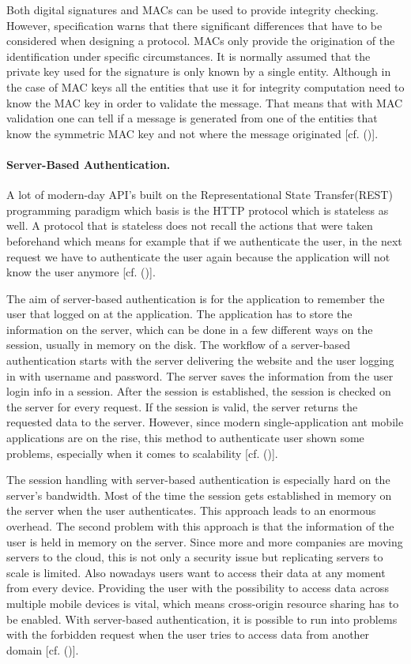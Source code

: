 {{	Both digital signatures and MACs can be used to provide integrity checking. However, specification warns that there significant differences that have to be considered when designing a protocol. MACs only provide the origination of the identification under specific circumstances. It is normally assumed that the private key used for the signature is only known by a single entity. Although in the case of MAC keys all the entities that use it for integrity computation need to know the MAC key in order to validate the message. That means that with MAC validation one can tell if a message is generated from one of the entities that know the symmetric MAC key and not where the message originated [cf. (\cite{JWT:IETF:Jones:2015})].


\paragraph{Server-Based Authentication.}
A lot of modern-day API’s built on the Representational State Transfer(REST) programming paradigm which basis is the HTTP protocol which is stateless as well. A protocol that is stateless does not recall the actions that were taken beforehand which means for example that if we authenticate the user, in the next request we have to authenticate the user again because the application will not know the user anymore [cf. (\cite{Serilleja:2015:Scothio})]. 

The aim of server-based authentication is for the application to remember the user that logged on at the application. The application has to store the information on the server, which can be done in a few different ways on the session, usually in memory on the disk. The workflow of a server-based authentication starts with the server delivering the website and the user logging in with username and password. The server saves the information from the user login info in a session. After the session is established, the session is checked on the server for every request. If the session is valid, the server returns the requested data to the server. However, since modern single-application ant mobile applications are on the rise, this method to authenticate user shown some problems, especially when it comes to scalability [cf. (\cite{Serilleja:2015:Scothio})]. 

The session handling with server-based authentication is especially hard on the server’s bandwidth. Most of the time the session gets established in memory on the server when the user authenticates. This approach leads to an enormous overhead. The second problem with this approach is that the information of the user is held in memory on the server. Since more and more companies are moving servers to the cloud, this is not only a security issue but replicating servers to scale is limited. Also nowadays users want to access their data at any moment from every device. Providing the user with the possibility to access data across multiple mobile devices is vital, which means cross-origin resource sharing has to be enabled. With server-based authentication, it is possible to run into problems with the forbidden request when the user tries to access data from another domain [cf. (\cite{Serilleja:2015:Scothio})].


}}
